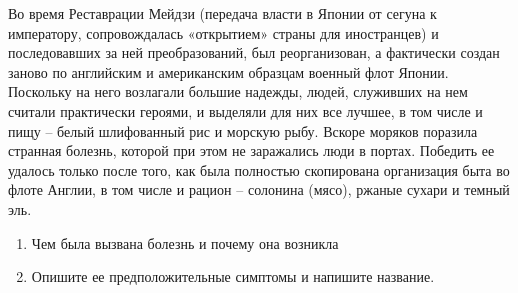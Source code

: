 
Во время Реставрации Мейдзи (передача власти в Японии от сегуна к императору, сопровождалась «открытием» страны для иностранцев) 
и последовавших за ней преобразований, был реорганизован, а фактически создан заново по английским и американским образцам 
военный флот Японии. Поскольку на него возлагали большие надежды, людей, служивших на нем считали практически героями, и 
выделяли для них все лучшее, в том числе и пищу – белый шлифованный рис и морскую рыбу. Вскоре моряков поразила странная 
болезнь, которой при этом не заражались люди в портах. 
Победить ее удалось только после того, как была полностью скопирована организация быта во флоте Англии, 
в том числе и рацион – солонина (мясо), ржаные сухари и темный эль.

\begin{enumerate}
    \item Чем была вызвана болезнь и почему она возникла
    \item Опишите ее предположительные симптомы и напишите название.
\end{enumerate}
